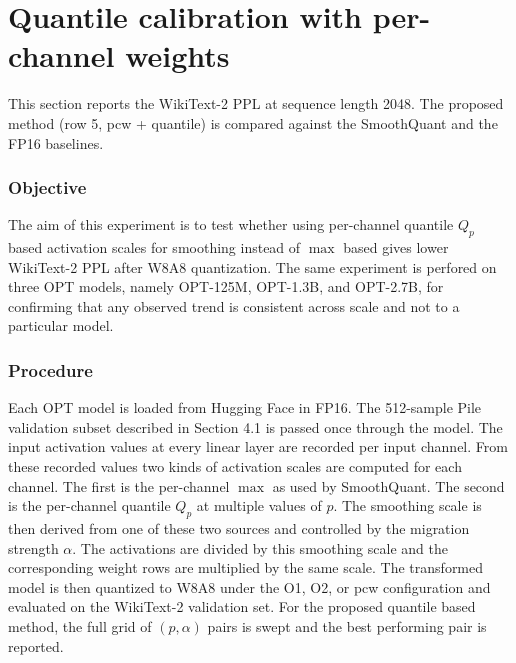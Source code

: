\section{Quantile calibration with per-channel weights}

This section reports the WikiText-2 PPL at sequence length 2048. The proposed method (row 5, pcw + quantile) is compared against the SmoothQuant and the FP16 baselines.

\subsubsection*{Objective}
The aim of this experiment is to test whether using per-channel quantile $Q_p$ based activation scales for smoothing instead of $\max$ based gives lower WikiText-2 PPL after W8A8 quantization. The same experiment is perfored on three OPT models, namely OPT-125M, OPT-1.3B, and OPT-2.7B, for confirming that any observed trend is consistent across scale and not to a particular model.

\subsubsection*{Procedure}
Each OPT model is loaded from Hugging Face in FP16. The 512-sample Pile validation subset described in Section 4.1 is passed once through the model. The input activation values at every linear layer are recorded per input channel. From these recorded values two kinds of activation scales are computed for each channel. The first is the per-channel $\max$ as used by SmoothQuant. The second is the per-channel quantile $Q_p$ at multiple values of $p$. The smoothing scale is then derived from one of these two sources and controlled by the migration strength $\alpha$. The activations are divided by this smoothing scale and the corresponding weight rows are multiplied by the same scale. The transformed model is then quantized to W8A8 under the O1, O2, or pcw configuration and evaluated on the WikiText-2 validation set. For the proposed quantile based method, the full grid of $(p, \alpha)$ pairs is swept and the best performing pair is reported.

